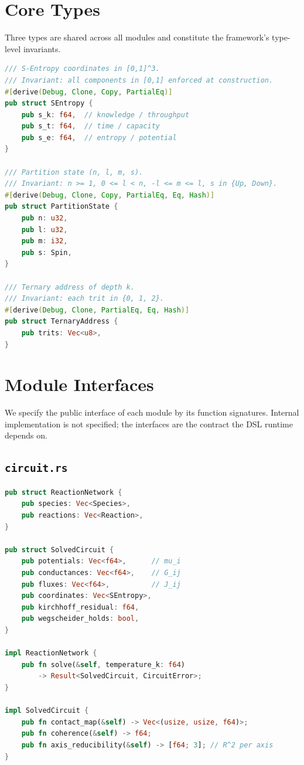\documentclass[11pt,a4paper]{article}
\theoremstyle{planstyle}
\theoremstyle{definition}
\theoremstyle{remark}
\begin{document}
\section{Core Types}
\label{sec:core-types}

Three types are shared across all modules and constitute the framework's
type-level invariants.

\begin{lstlisting}[language=rust]
/// S-Entropy coordinates in [0,1]^3.
/// Invariant: all components in [0,1] enforced at construction.
#[derive(Debug, Clone, Copy, PartialEq)]
pub struct SEntropy {
    pub s_k: f64,  // knowledge / throughput
    pub s_t: f64,  // time / capacity
    pub s_e: f64,  // entropy / potential
}

/// Partition state (n, l, m, s).
/// Invariant: n >= 1, 0 <= l < n, -l <= m <= l, s in {Up, Down}.
#[derive(Debug, Clone, Copy, PartialEq, Eq, Hash)]
pub struct PartitionState {
    pub n: u32,
    pub l: u32,
    pub m: i32,
    pub s: Spin,
}

/// Ternary address of depth k.
/// Invariant: each trit in {0, 1, 2}.
#[derive(Debug, Clone, PartialEq, Eq, Hash)]
pub struct TernaryAddress {
    pub trits: Vec<u8>,
}
\end{lstlisting}

\section{Module Interfaces}
\label{sec:interfaces}

We specify the public interface of each module by its function
signatures. Internal implementation is not specified; the interfaces
are the contract the DSL runtime depends on.

\subsection{\texttt{circuit.rs}}

\begin{lstlisting}[language=rust]
pub struct ReactionNetwork {
    pub species: Vec<Species>,
    pub reactions: Vec<Reaction>,
}

pub struct SolvedCircuit {
    pub potentials: Vec<f64>,      // mu_i
    pub conductances: Vec<f64>,    // G_ij
    pub fluxes: Vec<f64>,          // J_ij
    pub coordinates: Vec<SEntropy>,
    pub kirchhoff_residual: f64,
    pub wegscheider_holds: bool,
}

impl ReactionNetwork {
    pub fn solve(&self, temperature_k: f64)
        -> Result<SolvedCircuit, CircuitError>;
}

impl SolvedCircuit {
    pub fn contact_map(&self) -> Vec<(usize, usize, f64)>;
    pub fn coherence(&self) -> f64;
    pub fn axis_reducibility(&self) -> [f64; 3]; // R^2 per axis
}
\end{lstlisting}
\end{document}
